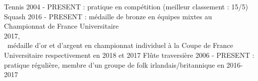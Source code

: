 

\begin{cvskills}

  \cvskill
    {Tennis} %
    {2004 - PRESENT : pratique en compétition (meilleur classement : 15/5)} 
  \cvskill
    {Squash} %
    {2016 - PRESENT : médaille de bronze en équipes mixtes au Championnat de France Universitaire 2017,\ \ \ \ \ \ \ \ \ \ \ \ \ \ \ \ \ \ \ \ \ \ \ \ \ \ \ \ \ \ \ \ \ \ \ \ \ \ \ \ \ \ \ \ \ \ \ \ \ \ \ \ \ \ \ \ \ \ \ \ \ \ \ \ \ \ \ \ médaille d'or et d'argent en championnat individuel à la Coupe de France Universitaire respectivement en 2018 et 2017} 
  \cvskill
    {Flûte traversière} %
    {2006 - PRESENT : pratique régulière, membre d'un groupe de folk irlandais/britannique en 2016-2017} 
\end{cvskills}
